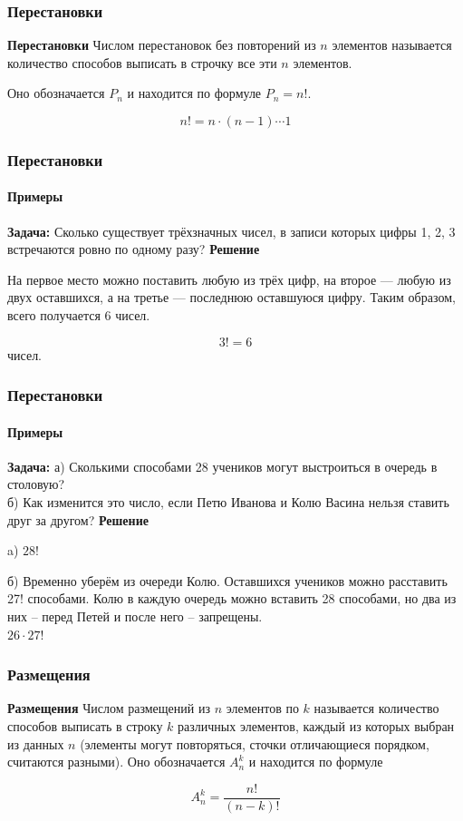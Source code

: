 \begin{frame}
\frametitle{Перестановки}
{\bf Перестановки} Числом перестановок без повторений из $n$ элементов называется количество способов выписать в строчку все эти $n$ элементов. 

Оно обозначается $P_n$ и находится по формуле $P_n=n!$.

$$ n! = n\cdot(n-1)\cdots 1$$

\end{frame}



\begin{frame}
\frametitle{Перестановки}
\framesubtitle{Примеры}
\textbf{Задача:} Сколько существует трёхзначных чисел, в записи которых цифры 1, 2, 3 встречаются ровно по одному разу?
\pause
\textbf{Решение}

На первое место можно поставить любую из трёх цифр, на второе --- любую из двух оставшихся, а на третье --- последнюю оставшуюся цифру. Таким образом, всего получается 6 чисел.

$$3! = 6$$  чисел. 

\end{frame}

\begin{frame}
\frametitle{Перестановки}
\framesubtitle{Примеры}
\textbf{Задача:} 
а) Сколькими способами 28 учеников могут выстроиться в очередь в столовую?\\
б) Как изменится это число, если Петю Иванова и Колю Васина нельзя ставить друг за другом? 
\pause
\textbf{Решение}

a) $28!$

б) Временно уберём из очереди Колю. Оставшихся учеников можно расставить 27! способами. Колю в каждую очередь можно вставить 28 способами, но два из них – перед Петей и после него – запрещены. \\
$26\cdot27!$

\end{frame}

\begin{frame}
\frametitle{Размещения}
{\bf Размещения} Числом размещений  из $n$ элементов по $k$ называется количество способов выписать в строку $k$ различных элементов, каждый из которых выбран из данных $n$ (элементы могут повторяться, сточки отличающиеся порядком, считаются разными). Оно обозначается $A_n^k$ и находится
по формуле

$$A_n^k=\frac{n!}{(n-k)!}$$
\end{frame}



